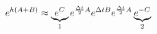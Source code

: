 \documentclass[preview]{standalone}
\begin{document}
\begin{align*}
\special{dvisvgm:raw <g id='unique000'>}e^{h(A+B)} \approx  \underbrace{e^C}_1 e^{\frac{\Delta t}{2}A} e^{\Delta t B} e^{\frac{\Delta t}{2}A} \underbrace{e^{-C}}_2\special{dvisvgm:raw </g>}
\end{align*}
\end{document}

